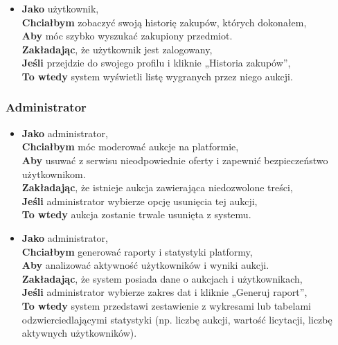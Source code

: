 \begin{itemize}
    \item \textbf{Jako} użytkownik,\\
          \textbf{Chciałbym} zobaczyć swoją historię zakupów, których dokonałem,\\
          \textbf{Aby} móc szybko wyszukać zakupiony przedmiot. \\
          \textbf{Zakładając}, że użytkownik jest zalogowany,\\
          \textbf{Jeśli} przejdzie do swojego profilu i kliknie „Historia zakupów”,\\
          \textbf{To wtedy} system wyświetli listę wygranych przez niego aukcji.\\
\end{itemize}
\subsubsection{Administrator}
\begin{itemize}
    \item \textbf{Jako} administrator,\\
          \textbf{Chciałbym} móc moderować aukcje na platformie, \\
          \textbf{Aby} usuwać z serwisu nieodpowiednie oferty i zapewnić bezpieczeństwo użytkownikom. \\
          \textbf{Zakładając}, że istnieje aukcja zawierająca niedozwolone treści,\\
          \textbf{Jeśli} administrator wybierze opcję usunięcia tej aukcji, \\
          \textbf{To wtedy} aukcja zostanie trwale usunięta z systemu.\\
    \item \textbf{Jako} administrator, \\
          \textbf{Chciałbym} generować raporty i statystyki platformy, \\
          \textbf{Aby} analizować aktywność użytkowników i wyniki aukcji. \\
          \textbf{Zakładając}, że system posiada dane o aukcjach i użytkownikach,\\
          \textbf{Jeśli} administrator wybierze zakres dat i kliknie „Generuj raport”,\\
          \textbf{To wtedy} system przedstawi zestawienie z wykresami lub tabelami odzwierciedlającymi statystyki (np. liczbę aukcji, wartość licytacji, liczbę aktywnych użytkowników).


\end{itemize}
